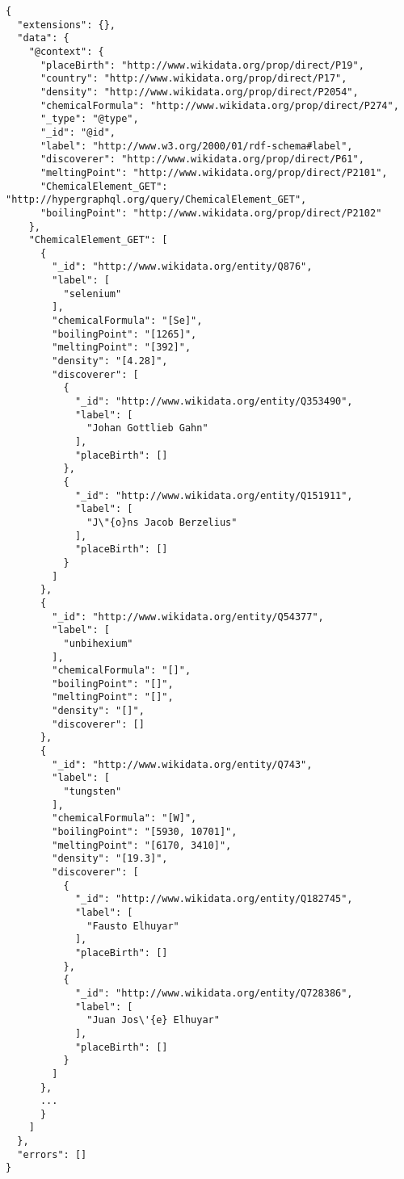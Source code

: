 \begin{minipage}{\linewidth}
\begin{lstlisting}[label=listing:listing33, caption={Output}]
{
  "extensions": {},
  "data": {
    "@context": {
      "placeBirth": "http://www.wikidata.org/prop/direct/P19",
      "country": "http://www.wikidata.org/prop/direct/P17",
      "density": "http://www.wikidata.org/prop/direct/P2054",
      "chemicalFormula": "http://www.wikidata.org/prop/direct/P274",
      "_type": "@type",
      "_id": "@id",
      "label": "http://www.w3.org/2000/01/rdf-schema#label",
      "discoverer": "http://www.wikidata.org/prop/direct/P61",
      "meltingPoint": "http://www.wikidata.org/prop/direct/P2101",
      "ChemicalElement_GET": "http://hypergraphql.org/query/ChemicalElement_GET",
      "boilingPoint": "http://www.wikidata.org/prop/direct/P2102"
    },
    "ChemicalElement_GET": [
      {
        "_id": "http://www.wikidata.org/entity/Q876",
        "label": [
          "selenium"
        ],
        "chemicalFormula": "[Se]",
        "boilingPoint": "[1265]",
        "meltingPoint": "[392]",
        "density": "[4.28]",
        "discoverer": [
          {
            "_id": "http://www.wikidata.org/entity/Q353490",
            "label": [
              "Johan Gottlieb Gahn"
            ],
            "placeBirth": []
          },
          {
            "_id": "http://www.wikidata.org/entity/Q151911",
            "label": [
              "J\"{o}ns Jacob Berzelius"
            ],
            "placeBirth": []
          }
        ]
      },
      {
        "_id": "http://www.wikidata.org/entity/Q54377",
        "label": [
          "unbihexium"
        ],
        "chemicalFormula": "[]",
        "boilingPoint": "[]",
        "meltingPoint": "[]",
        "density": "[]",
        "discoverer": []
      },
      {
        "_id": "http://www.wikidata.org/entity/Q743",
        "label": [
          "tungsten"
        ],
        "chemicalFormula": "[W]",
        "boilingPoint": "[5930, 10701]",
        "meltingPoint": "[6170, 3410]",
        "density": "[19.3]",
        "discoverer": [
          {
            "_id": "http://www.wikidata.org/entity/Q182745",
            "label": [
              "Fausto Elhuyar"
            ],
            "placeBirth": []
          },
          {
            "_id": "http://www.wikidata.org/entity/Q728386",
            "label": [
              "Juan Jos\'{e} Elhuyar"
            ],
            "placeBirth": []
          }
        ]
      },
	  ...
      }
    ]
  },
  "errors": []
}
\end{lstlisting}
\end{minipage}


